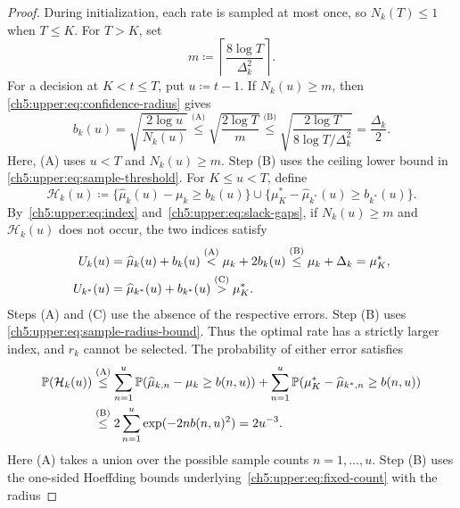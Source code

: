 \begin{proof}
During initialization, each rate is sampled at most once, so
$N_k(T)\le1$ when $T\le K$. For $T>K$, set
\begin{equation}
m\coloneqq\left\lceil\frac{8\log T}{\Delta_k^2}\right\rceil.
\label{ch5:upper:eq:sample-threshold}
\end{equation}
For a decision at $K<t\le T$, put $u\coloneqq t-1$. If $N_k(u)\ge m$, then
\eqref{ch5:upper:eq:confidence-radius} gives
\begin{equation}
b_k(u)
=\sqrt{\frac{2\log u}{N_k(u)}}
 \overset{\text{(A)}}{\le}\sqrt{\frac{2\log T}{m}}
\overset{\text{(B)}}{\le}\sqrt{\frac{2\log T}{8\log T/\Delta_k^2}}
=\frac{\Delta_k}{2}.
\label{ch5:upper:eq:sample-radius-bound}
\end{equation}
Here, (A) uses $u<T$ and $N_k(u)\ge m$. Step (B) uses the ceiling lower
bound in \eqref{ch5:upper:eq:sample-threshold}.
For $K\le u<T$, define
\begin{equation}
\mathcal H_k(u)
 \coloneqq\{\widehat\mu_k(u)-\mu_k\ge b_k(u)\}
\cup\{\mu_K^*-\widehat\mu_{k^*}(u)\ge b_{k^*}(u)\}.
 \label{ch5:upper:eq:sample-error-event}
\end{equation}
By~\eqref{ch5:upper:eq:index} and~\eqref{ch5:upper:eq:slack-gaps},
if $N_k(u)\ge m$ and $\mathcal H_k(u)$ does not occur, the two indices satisfy
\begin{align}
U_k(u)
&=\widehat\mu_k(u)+b_k(u)
 \overset{\text{(A)}}{<}\mu_k+2b_k(u)
 \overset{\text{(B)}}{\le}\mu_k+\Delta_k=\mu_K^*,\notag\\
U_{k^*}(u)&=\widehat\mu_{k^*}(u)+b_{k^*}(u)
 \overset{\text{(C)}}{>}\mu_K^*.
\label{ch5:upper:eq:sample-index-comparison}
\end{align}
Steps (A) and (C) use the absence of the respective errors. Step (B) uses
\eqref{ch5:upper:eq:sample-radius-bound}.
Thus the optimal rate has a strictly larger index, and $r_k$ cannot be
selected. The probability of either error satisfies
\begin{align}
\mathbb P(\mathcal H_k(u))
 &\overset{\mathrm{(A)}}{\le}
 \sum_{n=1}^{u}
 \mathbb P(\widehat\mu_{k,n}-\mu_k\ge b(n,u))
+\sum_{n=1}^{u}
 \mathbb P(\mu_K^*-\widehat\mu_{k^*,n}\ge b(n,u))\notag\\
&\overset{\mathrm{(B)}}{\le}
 2\sum_{n=1}^{u}\exp(-2nb(n,u)^2)
 =2u^{-3}.
\label{ch5:upper:eq:sample-error-probability}
\end{align}
Here (A) takes a union over the possible sample counts $n=1,\ldots,u$.
Step (B) uses the one-sided Hoeffding bounds
underlying~\eqref{ch5:upper:eq:fixed-count} with the radius

\end{proof}
